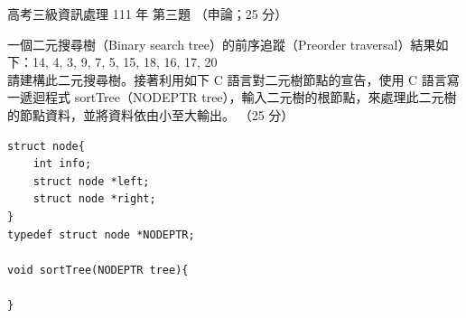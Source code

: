 \begin{pastexam}[label={px:gk3-111-ds-03}]{高考三級資訊處理 111 年 第三題}
（申論；25 分）

一個二元搜尋樹（Binary search tree）的前序追蹤（Preorder traversal）結果如下：14, 4, 3, 9, 7, 5, 15,
18, 16, 17, 20\\
請建構此二元搜尋樹。接著利用如下 C 語言對二元樹節點的宣告，使用 C 語言寫一遞迴程式
sortTree（NODEPTR tree），輸入二元樹的根節點，來處理此二元樹的節點資料，並將資料依由小至大輸出。
（25 分）
\begin{verbatim}
struct node{
    int info;
    struct node *left;
    struct node *right;
}
typedef struct node *NODEPTR;

void sortTree(NODEPTR tree){

}
\end{verbatim}
\end{pastexam}

